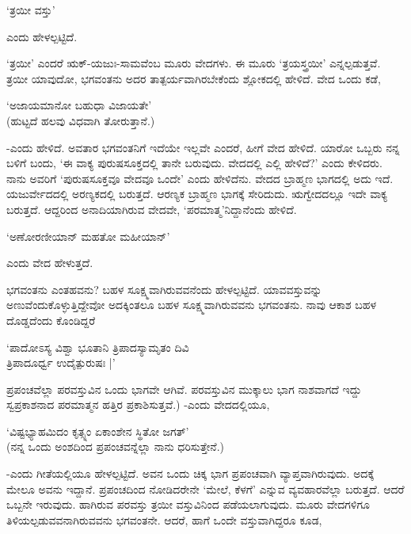 \begin{shloka}
`ತ್ರಯೀ ವಸ್ತು'
\end{shloka}

ಎಂದು ಹೇಳಲ್ಪಟ್ಟಿದೆ.

`ತ್ರಯೀ' ಎಂದರೆ ಋಕ್-ಯಜುಃ-ಸಾಮವೆಂಬ ಮೂರು ವೇದಗಳು. ಈ ಮೂರು `ತ್ರಯಸ್ತ್ರಯೀ' ಎನ್ನಲ್ಪಡುತ್ತವೆ. ತ್ರಯೀ ಯಾವುದೋ, ಭಗವಂತನು ಅದರ ತಾತ್ಪರ್ಯವಾಗಿರಬೇಕೆಂದು ಶ್ಲೋಕದಲ್ಲಿ ಹೇಳಿದೆ. ವೇದ ಒಂದು ಕಡೆ,

\begin{shloka}
`ಅಜಾಯಮಾನೋ ಬಹುಧಾ ವಿಜಾಯತೇ'\\
(ಹುಟ್ಟದೆ ಹಲವು ವಿಧವಾಗಿ ತೋರುತ್ತಾನೆ.)
\end{shloka}

-ಎಂದು ಹೇಳಿದೆ. ಅವತಾರ ಭಗವಂತನಿಗೆ ಇದೆಯೇ ಇಲ್ಲವೇ ಎಂದರೆ, ಹೀಗೆ ವೇದ ಹೇಳಿದೆ. ಯಾರೋ ಒಬ್ಬರು ನನ್ನ ಬಳಿಗೆ ಬಂದು, `ಈ ವಾಕ್ಯ ಪುರುಷಸೂಕ್ತದಲ್ಲಿ ತಾನೇ ಬರುವುದು. ವೇದದಲ್ಲಿ ಎಲ್ಲಿ ಹೇಳಿದೆ?' ಎಂದು ಕೇಳಿದರು. ನಾನು ಅವರಿಗೆ `ಪುರುಷಸೂಕ್ತವೂ ವೇದವೂ ಒಂದೇ' ಎಂದು ಹೇಳಿದೆನು. ವೇದದ ಬ್ರಾಹ್ಮಣ ಭಾಗದಲ್ಲಿ ಅದು ಇದೆ. ಯಜುರ್ವೇದದಲ್ಲಿ ಅರಣ್ಯಕದಲ್ಲಿ ಬರುತ್ತದೆ. ಆರಣ್ಯಕ ಬ್ರಾಹ್ಮಣ ಭಾಗಕ್ಕೆ ಸೇರಿದುದು. ಋಗ್ವೇದದಲ್ಲೂ ಇದೇ ವಾಕ್ಯ ಬರುತ್ತದೆ. ಆದ್ದರಿಂದ ಅನಾದಿಯಾಗಿರುವ ವೇದವೇ, `ಪರಮಾತ್ಮ'ನಿದ್ದಾನೆಂದು ಹೇಳಿದೆ.

\begin{shloka}
`ಅಣೋರಣೀಯಾನ್ ಮಹತೋ ಮಹೀಯಾನ್'
\end{shloka}

ಎಂದು ವೇದ ಹೇಳುತ್ತದೆ.

ಭಗವಂತನು ಎಂತಹವನು? ಬಹಳ ಸೂಕ್ಷ್ಮವಾಗಿರುವವನೆಂದು ಹೇಳಲ್ಪಟ್ಟಿದೆ. ಯಾವವಸ್ತುವನ್ನು ಅಣುವೆಂದುಕೊಳ್ಳುತ್ತಿದ್ದೇವೋ ಅದಕ್ಕಿಂತಲೂ ಬಹಳ ಸೂಕ್ಷ್ಮವಾಗಿರುವವನು ಭಗವಂತನು. ನಾವು ಆಕಾಶ ಬಹಳ ದೊಡ್ಡದೆಂದು ಕೊಂಡಿದ್ದರೆ 

\begin{shloka}
`ಪಾದೋಽಸ್ಯ ವಿಶ್ವಾ ಭೂತಾನಿ ತ್ರಿಪಾದಸ್ಯಾಮೃತಂ ದಿವಿ\\
ತ್ರಿಪಾದೂರ್ಧ್ವ ಉದೈತ್ಪುರುಷಃ‌ |'
\end{shloka}

ಪ್ರಪಂಚವೆಲ್ಲಾ ಪರವಸ್ತುವಿನ ಒಂದು ಭಾಗವೇ ಆಗಿವೆ. ಪರವಸ್ತುವಿನ ಮುಕ್ಕಾಲು ಭಾಗ ನಾಶವಾಗದೆ ಇದ್ದು ಸ್ವಪ್ರಕಾಶನಾದ ಪರಮಾತ್ಮನ ಹತ್ತಿರ ಪ್ರಕಾಶಿಸುತ್ತವೆ.) -ಎಂದು ವೇದದಲ್ಲಿಯೂ,

\begin{shloka}
`ವಿಷ್ಟಭ್ಯಾಹಮಿದಂ ಕೃತ್ಸ್ನಂ ಏಕಾಂಶೇನ ಸ್ಥಿತೋ ಜಗತ್'\\
(ನನ್ನ ಒಂದು ಅಂಶದಿಂದ ಪ್ರಪಂಚವನ್ನೆಲ್ಲಾ ನಾನು ಧರಿಸುತ್ತೇನೆ.)
\end{shloka}

-ಎಂದು ಗೀತೆಯಲ್ಲಿಯೂ ಹೇಳಲ್ಪಟ್ಟಿದೆ. ಅವನ ಒಂದು ಚಿಕ್ಕ ಭಾಗ ಪ್ರಪಂಚವಾಗಿ ವ್ಯಾಪ್ತವಾಗಿರುವುದು. ಅದಕ್ಕೆ ಮೇಲೂ ಅವನು ಇದ್ದಾನೆ. ಪ್ರಪಂಚದಿಂದ ನೋಡಿದರೇನೇ `ಮೇಲೆ, ಕೆಳಗೆ' ಎನ್ನುವ ವ್ಯವಹಾರವೆಲ್ಲಾ ಬರುತ್ತದೆ. ಆದರೆ ಒಬ್ಬನೇ ಇರುವುದು. ಹಾಗಿರುವ ಪರವಸ್ತು ತ್ರಯೀ ವಸ್ತುವಿನಿಂದ ಪಡೆಯಲಾಗುವುದು. ಮೂರು ವೇದಗಳಿಗೂ ತಿಳಿಯಲ್ಪಡುವವನಾಗಿರುವವನು ಭಗವಂತನೇ. ಆದರೆ, ಹಾಗೆ ಒಂದೇ ವಸ್ತುವಾಗಿದ್ದರೂ ಕೂಡ,

